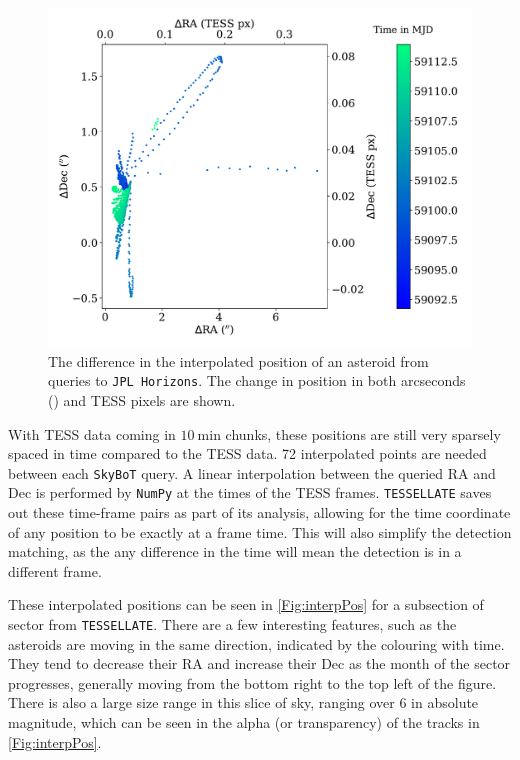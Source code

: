 \documentclass{UCreport}
\begin{document}
\begin{figure}[t]
  \centering
  \includegraphics[width =0.8 \textwidth]{./Figures/1990 KC1PosCheck.pdf} %
  \caption[Interpolated Position Verification]{
    The difference in the interpolated position of an asteroid from queries to \texttt{JPL Horizons}.
    The change in position in both arcseconds (\unit{\arcsec}) and TESS pixels are shown.
  }\label{Fig:errPos}
\end{figure}

With TESS data coming in $\qty{10}{\minute}$ chunks, these positions are still very sparsely spaced in time compared to the TESS data.
72 interpolated points are needed between each \texttt{SkyBoT} query.
A linear interpolation between the queried RA and Dec is performed by \texttt{NumPy} \citep{Harris2020} at the times of the TESS frames.
\texttt{TESSELLATE} saves out these time-frame pairs as part of its analysis, allowing for the time coordinate of any position to be exactly at a frame time.
This will also simplify the detection matching, as the any difference in the time will mean the detection is in a different frame.

These interpolated positions can be seen in \autoref{Fig:interpPos} for a subsection of sector from \texttt{TESSELLATE}.
There are a few interesting features, such as the asteroids are moving in the same direction, indicated by the colouring with time.
They tend to decrease their RA and increase their Dec as the month of the sector progresses, generally moving from the bottom right to the top left of the figure.
There is also a large size range in this slice of sky, ranging over \qty{6}{\mag} in absolute magnitude, which can be seen in the alpha (or transparency) of the tracks in \autoref{Fig:interpPos}.
\end{document}
